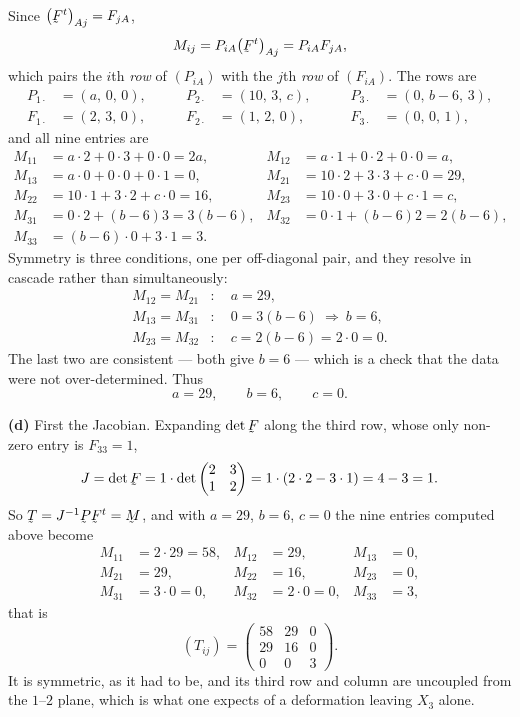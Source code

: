 \begin{solution}
Since $\big(\bF^{t}\big)_{Aj}=F_{jA}$,
\[
   M_{ij}=P_{iA}\big(\bF^{t}\big)_{Aj}=P_{iA}F_{jA} ,
\]
which pairs the $i$th \emph{row} of $(P_{iA})$ with the $j$th
\emph{row} of $(F_{iA})$. The rows are
\[
\begin{aligned}
   P_{1\cdot}&=(a,\,0,\,0), &\qquad P_{2\cdot}&=(10,\,3,\,c),
   &\qquad P_{3\cdot}&=(0,\,b-6,\,3),\\
   F_{1\cdot}&=(2,\,3,\,0), &\qquad F_{2\cdot}&=(1,\,2,\,0),
   &\qquad F_{3\cdot}&=(0,\,0,\,1),
\end{aligned}
\]
and all nine entries are
\[
\begin{aligned}
   M_{11}&=a\cdot2+0\cdot3+0\cdot0=2a, &
   M_{12}&=a\cdot1+0\cdot2+0\cdot0=a,\\
   M_{13}&=a\cdot0+0\cdot0+0\cdot1=0, &
   M_{21}&=10\cdot2+3\cdot3+c\cdot0=29,\\
   M_{22}&=10\cdot1+3\cdot2+c\cdot0=16, &
   M_{23}&=10\cdot0+3\cdot0+c\cdot1=c,\\
   M_{31}&=0\cdot2+(b-6)3=3(b-6), &
   M_{32}&=0\cdot1+(b-6)2=2(b-6),\\
   M_{33}&=(b-6)\cdot0+3\cdot1=3 .
\end{aligned}
\]
Symmetry is three conditions, one per off-diagonal pair, and they
resolve in cascade rather than simultaneously:
\[
\begin{aligned}
   M_{12}=M_{21}&:\quad a=29 ,\\
   M_{13}=M_{31}&:\quad 0=3(b-6)\ \Longrightarrow\ b=6 ,\\
   M_{23}=M_{32}&:\quad c=2(b-6)=2\cdot0=0 .
\end{aligned}
\]
The last two are consistent --- both give $b=6$ --- which is a check
that the data were not over-determined. Thus
\[
   \boxed{\ a=29,\qquad b=6,\qquad c=0 .\ }
\]

\medskip
\noindent\textbf{(d)}
First the Jacobian. Expanding $\det\bF$ along the third row, whose only
non-zero entry is $F_{33}=1$,
\[
   J=\det\bF
   =1\cdot\det\begin{pmatrix}2&3\\1&2\end{pmatrix}
   =1\cdot(2\cdot2-3\cdot1)=4-3=1 .
\]
So $\bT=J^{-1}\bP\bF^{t}=\bM$, and with $a=29$, $b=6$, $c=0$ the nine
entries computed above become
\[
\begin{aligned}
   M_{11}&=2\cdot29=58, & M_{12}&=29, & M_{13}&=0,\\
   M_{21}&=29, & M_{22}&=16, & M_{23}&=0,\\
   M_{31}&=3\cdot0=0, & M_{32}&=2\cdot0=0, & M_{33}&=3 ,
\end{aligned}
\]
that is
\[
   \boxed{\ (T_{ij})=\begin{pmatrix}
     58 & 29 & 0\\
     29 & 16 & 0\\
     0 & 0 & 3
   \end{pmatrix}. \ }
\]
It is symmetric, as it had to be, and its third row and column are
uncoupled from the $1$--$2$ plane, which is what one expects of a
deformation leaving $X_{3}$ alone.


\end{solution}
